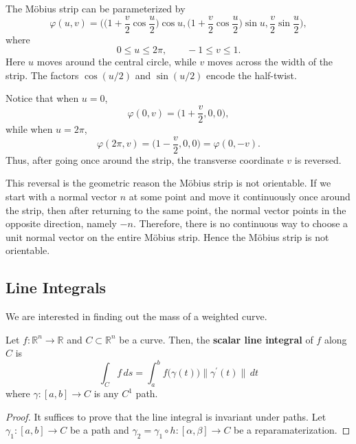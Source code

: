 			
	\begin{example}
	  \label{ex:m-obius-strip-is-not-orientable}
		The M\"obius strip can be parameterized by
		\begin{equation}
			\varphi(u,v)
			=
			\bigg(
				\bigg(1 + \frac{v}{2}\cos\frac{u}{2}\bigg)\cos u,
				\bigg(1 + \frac{v}{2}\cos\frac{u}{2}\bigg)\sin u,
				\frac{v}{2}\sin\frac{u}{2}
			\bigg),
		\end{equation}
		where
		\begin{equation}
			0 \leq u \leq 2\pi,
			\qquad
			-1 \leq v \leq 1.
		\end{equation}
		Here $u$ moves around the central circle, while $v$ moves across the width
		of the strip. The factors $\cos(u/2)$ and $\sin(u/2)$ encode the half-twist.
			
		Notice that when $u = 0$,
		\begin{equation}
			\varphi(0,v)
			=
			\bigg(1+\frac{v}{2},0,0\bigg),
		\end{equation}
		while when $u = 2\pi$,
		\begin{equation}
			\varphi(2\pi,v)
			=
			\bigg(1-\frac{v}{2},0,0\bigg)
			=
			\varphi(0,-v).
		\end{equation}
		Thus, after going once around the strip, the transverse coordinate $v$ is
		reversed.
			
		This reversal is the geometric reason the M\"obius strip is not orientable. If we start with a normal vector $n$ at some point and move it continuously once around the strip, then after returning to the same point, the normal vector points in the opposite direction, namely $-n$. Therefore, there is no continuous way to choose a unit normal vector on the entire M\"obius strip. Hence the M\"obius strip is not orientable.
	\end{example}

\subsection{Line Integrals}
		
	We are interested in finding out the mass of a weighted curve. 
		
  \begin{definition}
    \label{def:scalar-line-integral}
		Let $f: \mathbb{R}^n \to \mathbb{R}$ and $C \subset \mathbb{R}^n$ be a curve. Then, the \textbf{scalar line integral} of $f$ along $C$ is 
		\begin{equation}
			\int_C f \,ds  = \int_a^b f\big(\gamma(t)\big) \|\gamma^\prime (t)\| \,dt
		\end{equation}
		where $\gamma: [a, b] \to C$ is any $C^1$ path. 
  \end{definition}
	\begin{proof}
		It suffices to prove that the line integral is invariant under paths. Let $\gamma_1: [a, b] \to C$ be a path and $\gamma_2 = \gamma_1 \circ h: [\alpha, \beta] \to C$ be a reparamaterization. 
	\end{proof}
		

